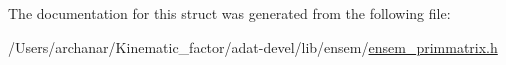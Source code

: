 The documentation for this struct was generated from the following file\+:\begin{DoxyCompactItemize}
\item 
/\+Users/archanar/\+Kinematic\+\_\+factor/adat-\/devel/lib/ensem/\mbox{\hyperlink{adat-devel_2lib_2ensem_2ensem__primmatrix_8h}{ensem\+\_\+primmatrix.\+h}}\end{DoxyCompactItemize}

